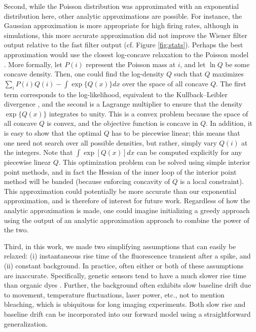 Second, while the Poisson distribution was approximated with an exponential distribution here, other analytic approximations are possible. For instance, the Gaussian approximation is more appropriate for high firing rates, although in simulations, this more accurate approximation did not improve the Wiener filter output relative to the fast filter output (cf. Figure \ref{fig:stats}).  %
Perhaps the best approximation would use the closest log-concave relaxation to the Poisson model \cite{KoenkerMizera10}. More formally, let $P(i)$ represent the Poisson mass at $i$, and let $\ln Q$ be some concave density.  Then, one could find the log-density $Q$ such that $Q$ maximizes $\sum_i P(i) Q(i) - \int \exp \{Q(x)\} dx$ over the space of all concave $Q$. The first term corresponds to the log-likelihood, equivalent to the Kullback–Leibler divergence \cite{CoverThomas91}, and the second is a Lagrange multiplier to ensure that the density $\exp\{Q(x)\}$ integrates to unity. This is a convex problem because the space of all concave $Q$ is convex, and the objective function is concave in $Q$. In addition, it is easy to show that the optimal $Q$ has to be piecewise linear; this means that one need not search over all possible densities, but rather, simply vary $Q(i)$ at the integers. Note that $\int \exp[Q(x)] dx$ can be computed explicitly for any piecewise linear $Q$. This optimization problem can be solved using simple interior point methods, and in fact the Hessian of the inner loop of the interior point method will be banded (because enforcing concavity of $Q$ is a local constraint). This approximation could potentially be more accurate than our exponential approximation, and is therefore of interest for future work. Regardless of how the analytic approximation is made, one could imagine initializing a greedy approach using the output of an analytic approximation approach to combine the power of the two.  

Third, in this work, we made two simplifying assumptions that can easily be relaxed: (i) instantaneous rise time of the fluorescence transient after a spike, and (ii) constant background.  In practice, often either or both of these assumptions are inaccurate.  Specifically, genetic sensors tend to have a much slower rise time than organic dyes \cite{ReiffBorst05}.  Further, the background often exhibits slow baseline drift due to movement, temperature fluctuations, laser power, etc., not to mention bleaching, which is ubiquitous for long imaging experiments.  Both slow rise and baseline drift can be incorporated into our forward model using a straightforward generalization. 

